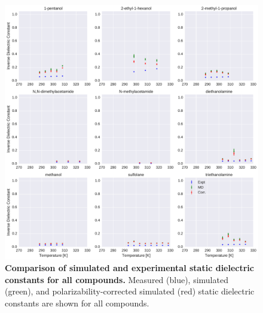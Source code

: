 \documentclass[aps,pre,twocolumn,nofootinbib,superscriptaddress,linenumbers]{revtex4-1}
\begin{document}
\begin{figure}[alldielectric]

\ContinuedFloat

\includegraphics[width=\textwidth]{./figures/dielectric_versus_temperature_part2.pdf}

\caption{{\bf Comparison of simulated and experimental static dielectric constants for all compounds.}
Measured (blue), simulated (green), and polarizability-corrected simulated (red) static dielectric constants are shown for all compounds.
}

\label{figure:AllDielectrics}

\end{figure}
\end{document}
